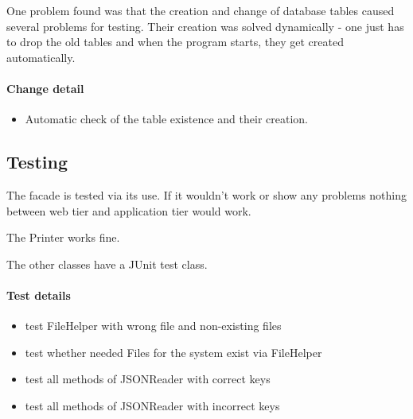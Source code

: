 One problem found was that the creation and change of database tables caused several problems
for testing. Their creation was solved dynamically - one just has to drop the old tables 
and when the program starts, they get created automatically.

\paragraph{Change detail}
\begin{itemize}
  \item Automatic check of the table existence and their creation.
\end{itemize}


\subsection{Testing}
The facade is tested via its use. If it wouldn't work or show any problems
nothing between web tier and application tier would work.

The Printer works fine.

The other classes have a JUnit test class.
\paragraph{Test details}
\begin{itemize}
  \item test FileHelper with wrong file and non-existing files
  \item test whether needed Files for the system exist via FileHelper
  \item test all methods of JSONReader with correct keys
  \item test all methods of JSONReader with incorrect keys
\end{itemize}




